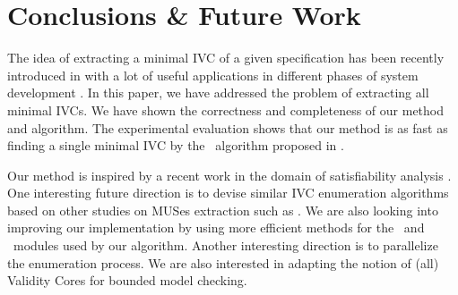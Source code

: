 \section{Conclusions \& Future Work}
\label{sec:conc}
The idea of extracting a minimal IVC of a given
specification has been recently introduced in \cite{Ghass16} with a lot of useful applications in different phases of system development \cite{Ghass16, Murugesan16:renext}.
In this paper, we have addressed the problem of extracting all minimal IVCs. We have shown
the correctness and completeness of our method and algorithm.
The experimental evaluation shows that our method is as fast as finding a single
 minimal IVC by the \ucbfalg ~algorithm proposed in \cite{Ghass16}.

 Our method is inspired by a recent work in the domain of satisfiability analysis \cite{marco2016fast}. One interesting future direction is to devise similar IVC enumeration algorithms based on other studies on MUSes extraction such as \cite{Bacchus2016, nadel2014accelerated}.
 We are also looking into improving our implementation by using more
 efficient methods for the \isadeq ~and \getivc ~modules used by our algorithm.
 Another interesting direction is to parallelize the enumeration process.
 We are also interested in adapting the notion of (all) Validity Cores for bounded model checking.
